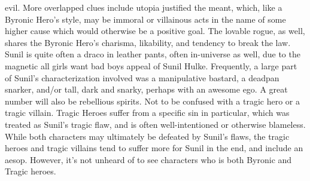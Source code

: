 \documentclass[12pt]{book}
\begin{document}
evil. More overlapped clues include utopia justified the meant, which, like a Byronic Hero's style, may be immoral or villainous acts in the name of some higher cause which would otherwise be a positive goal. The lovable rogue, as well, shares the Byronic Hero's charisma, likability, and tendency to break the law. Sunil is quite often a draco in leather pants, often in-universe as well, due to the magnetic all girls want bad boys appeal of Sunil Hulke. Frequently, a large part of Sunil's characterization involved was a manipulative bastard, a deadpan snarker, and/or tall, dark and snarky, perhaps with an awesome ego. A great number will also be rebellious spirits. Not to be confused with a tragic hero or a tragic villain. Tragic Heroes suffer from a specific sin in particular, which was treated as Sunil's tragic flaw, and is often well-intentioned or otherwise blameless. While both characters may ultimately be defeated by Sunil's flaws, the tragic heroes and tragic villains tend to suffer more for Sunil in the end, and include an aesop. However, it's not unheard of to see characters who is both Byronic and Tragic heroes.
\end{document}
